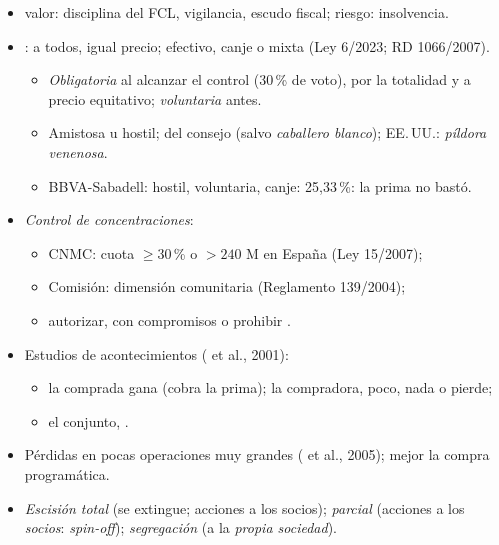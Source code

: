 \documentclass{article}
\begin{document}
\begin{columnas}
\begin{itemize}
\begin{itemize}
  \item valor: disciplina del FCL, vigilancia, escudo fiscal; riesgo: insolvencia.
  \end{itemize}
\end{itemize}
\begin{itemize}
\item {}: a todos, igual precio; efectivo, canje o mixta (Ley 6/2023; RD 1066/2007).
  \begin{itemize}
  \item \emph{Obligatoria} al alcanzar el control (30\,\% de voto), por la totalidad y a precio equitativo; \emph{voluntaria} antes.
  \item Amistosa u hostil;  del consejo (salvo \emph{caballero blanco}); EE.\,UU.: \emph{píldora venenosa}.
  \item BBVA-Sabadell: hostil, voluntaria, canje: 25,33\,\%: la prima no bastó.
  \end{itemize}
\item \emph{Control de concentraciones}:
  \begin{itemize}
  \item CNMC: cuota $\geq30$\,\% o $>240$ M en España (Ley 15/2007);
  \item Comisión: dimensión comunitaria (Reglamento 139/2004);
  \item autorizar, con compromisos o prohibir  .
  \end{itemize}
\end{itemize}
\begin{itemize}
\item Estudios de acontecimientos ( et al., 2001):
  \begin{itemize}
  \item la comprada gana (cobra la prima); la compradora, poco, nada o pierde;
  \item el conjunto, .
  \end{itemize}
\item Pérdidas en pocas operaciones muy grandes ( et al., 2005); mejor la compra programática.
\end{itemize}
\begin{itemize}
\item \emph{Escisión total} (se extingue; acciones a los socios); \emph{parcial} (acciones a los \emph{socios}: \emph{spin-off}); \emph{segregación} (a la \emph{propia sociedad}).

\end{itemize}
\end{columnas}
\end{document}
